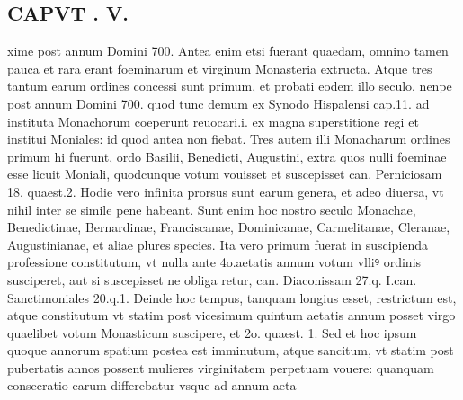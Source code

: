 \documentclass{article}
\begin{document}
\begin{pages}
\section*{CAPVT . V. }
\marginpar{[ p.293 ]}\pstart xime post annum Domini 700. Antea enim etsi fuerant quaedam, omnino tamen pauca et rara erant foeminarum et virginum Monasteria extructa. Atque tres tantum earum ordines concessi sunt primum, et probati eodem illo seculo, nenpe post annum Domini 700. quod tunc demum ex Synodo Hispalensi cap.11. ad instituta Monachorum coeperunt reuocari.i. ex magna superstitione regi et institui Moniales: id quod antea non fiebat. Tres autem illi Monacharum ordines primum hi fuerunt, ordo Basilii, Benedicti, Augustini, extra quos nulli foeminae esse licuit Moniali, quodcunque votum vouisset et suscepisset can. Perniciosam 18. quaest.2. Hodie vero infinita prorsus sunt earum genera, et adeo diuersa, vt nihil inter se simile pene habeant. Sunt enim hoc nostro seculo Monachae, Benedictinae, Bernardinae, Franciscanae, Dominicanae, Carmelitanae, Cleranae, Augustinianae, et aliae plures species. Ita vero primum fuerat in suscipienda professione constitutum, vt nulla ante 4o.aetatis annum votum vlliꝰ ordinis susciperet, aut si suscepisset ne obliga retur, can. Diaconissam 27.q. I.can. Sanctimoniales 20.q.1. Deinde hoc tempus, tanquam longius esset, restrictum est, atque constitutum vt statim post vicesimum quintum aetatis annum posset virgo quaelibet votum Monasticum suscipere, et 2o. quaest. 1. Sed et hoc ipsum quoque annorum spatium postea est imminutum, atque sancitum, vt statim post pubertatis annos possent mulieres virginitatem perpetuam vouere: quanquam consecratio earum differebatur vsque ad annum aeta\pend

\end{pages}
\end{document}

